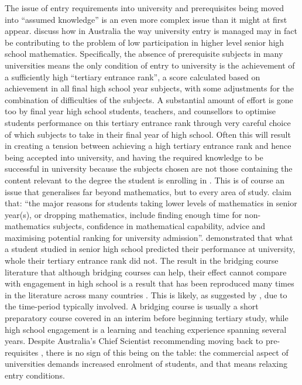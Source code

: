 \documentclass[twoside,12pt,a4paper]{report}
\begin{document}
The issue of entry requirements into university and prerequisites being moved into ``assumed knowledge'' is an even more complex issue than it might at first appear.  discuss how in Australia the way university entry is managed may in fact be contributing to the problem of low participation in higher level senior high school mathematics. Specifically, the absence of prerequisite subjects in many universities means the only condition of entry to university is the achievement of a sufficiently high ``tertiary entrance rank'', a score calculated based on achievement in all final high school year subjects, with some adjustments for the combination of difficulties of the subjects. A substantial amount of effort is gone too by final year high school students, teachers, and counsellors to optimise students performance on this tertiary entrance rank through very careful choice of which subjects to take in their final year of high school. Often this will result in creating a tension between achieving a high tertiary entrance rank and hence being accepted into university, and having the required knowledge to be successful in university because the subjects chosen are not those containing the content relevant to the degree the student is enrolling in \cite{Gordon2013b, Poladian2013}. This is of course an issue that generalises far beyond mathematics, but to every area of study.  claim that: ``the major reasons for students taking lower
levels of mathematics in senior year(s), or dropping mathematics, include finding enough
time for non-mathematics subjects, confidence in mathematical capability, advice and
maximising potential ranking for university admission''.  demonstrated that what a student studied in senior high school predicted their performance at university, whole their tertiary entrance rank did not. The result in the bridging course literature that although bridging courses can help, their effect cannot compare with engagement in high school is a result that has been reproduced many times in the literature across many countries \cite{Kajander2005, Nicholas2015b, Tariq2002}. This is likely, as suggested by , due to the time-period typically involved. A bridging course is usually a short preparatory course covered in an interim before beginning tertiary study, while high school engagement is a learning and teaching experience spanning several years. Despite Australia's Chief Scientist recommending moving back to pre-requisites \cite{Chubb2012}, there is no sign of this being on the table: the commercial aspect of universities demands increased enrolment of students, and that means relaxing entry conditions. 
\end{document}
